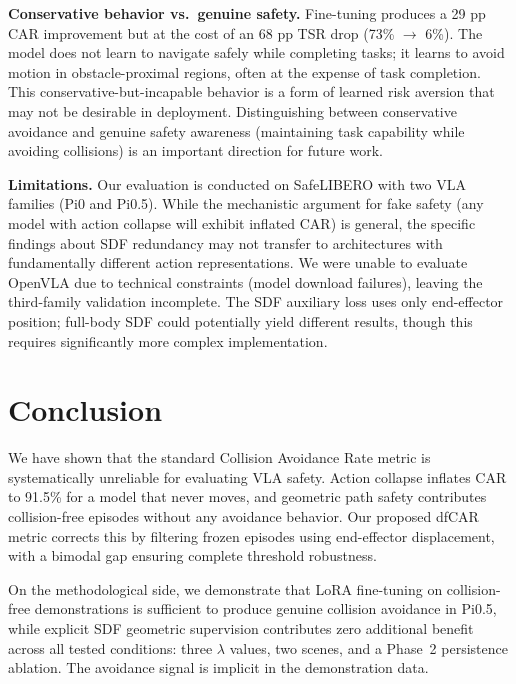 \documentclass[10pt,letterpaper]{article}
\begin{document}
\textbf{Conservative behavior vs.\ genuine safety.} Fine-tuning produces a 29 pp CAR improvement but at the cost of an 68 pp TSR drop (73\% $\to$ 6\%). The model does not learn to navigate safely while completing tasks; it learns to avoid motion in obstacle-proximal regions, often at the expense of task completion. This conservative-but-incapable behavior is a form of learned risk aversion that may not be desirable in deployment. Distinguishing between conservative avoidance and genuine safety awareness (maintaining task capability while avoiding collisions) is an important direction for future work.

\textbf{Limitations.} Our evaluation is conducted on SafeLIBERO with two VLA families (Pi0 and Pi0.5). While the mechanistic argument for fake safety (any model with action collapse will exhibit inflated CAR) is general, the specific findings about SDF redundancy may not transfer to architectures with fundamentally different action representations. We were unable to evaluate OpenVLA due to technical constraints (model download failures), leaving the third-family validation incomplete. The SDF auxiliary loss uses only end-effector position; full-body SDF could potentially yield different results, though this requires significantly more complex implementation.

\section{Conclusion}
\label{sec:conclusion}

We have shown that the standard Collision Avoidance Rate metric is systematically unreliable for evaluating VLA safety. Action collapse inflates CAR to 91.5\% for a model that never moves, and geometric path safety contributes collision-free episodes without any avoidance behavior. Our proposed dfCAR metric corrects this by filtering frozen episodes using end-effector displacement, with a bimodal gap ensuring complete threshold robustness.

On the methodological side, we demonstrate that LoRA fine-tuning on collision-free demonstrations is sufficient to produce genuine collision avoidance in Pi0.5, while explicit SDF geometric supervision contributes zero additional benefit across all tested conditions: three $\lambda$ values, two scenes, and a Phase~2 persistence ablation. The avoidance signal is implicit in the demonstration data.
\end{document}
